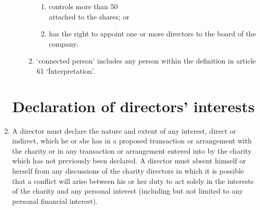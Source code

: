 \documentclass{article}
\begin{document}
\begin{enumerate}[label=\arabic*]
\begin{enumerate}[label=(\arabic*)]
\begin{enumerate}[label=(\alph*)]
\begin{enumerate}[label=(\roman*)]
                \item controls more than 50\\%
                attached to the shares; or
                \item has the right to appoint one or more directors to the
                board of the company.
            \end{enumerate}
            \item ‘connected person’ includes any person within the
            definition in article 61 ‘Interpretation’.
        \end{enumerate}
    \end{enumerate}
    
    \section{Declaration of directors’ interests}
    \item A director must declare the nature and extent of any interest, direct or
    indirect, which he or she has in a proposed transaction or arrangement
    with the charity or in any transaction or arrangement entered into by
    the charity which has not previously been declared. A director must
    absent himself or herself from any discussions of the charity directors
    in which it is possible that a conflict will arise between his or her duty
    to act solely in the interests of the charity and any personal interest
    (including but not limited to any personal financial interest).
    

\end{enumerate}
\end{document}
